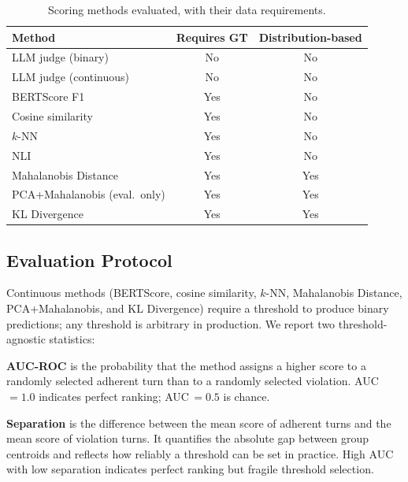 \documentclass[11pt,a4paper]{article}
\begin{document}
\begin{table}[h]
  \centering
  \caption{Scoring methods evaluated, with their data requirements.}
  \label{tab:methods}
  \begin{tabular}{lcc}
    \toprule
    \textbf{Method} & \textbf{Requires GT} & \textbf{Distribution-based} \\
    \midrule
    LLM judge (binary)         & No  & No  \\
    LLM judge (continuous)     & No  & No  \\
    BERTScore F1               & Yes & No  \\
    Cosine similarity          & Yes & No  \\
    $k$-NN                     & Yes & No  \\
    NLI                        & Yes & No  \\
    Mahalanobis Distance       & Yes & Yes \\
    PCA+Mahalanobis (eval.\ only) & Yes & Yes \\
    KL Divergence              & Yes & Yes \\
    \bottomrule
  \end{tabular}
\end{table}

\subsection{Evaluation Protocol}

Continuous methods (BERTScore, cosine similarity, $k$-NN, Mahalanobis Distance,
PCA+Mahalanobis, and KL Divergence) require a threshold to produce binary
predictions; any threshold is arbitrary in production. We report two
threshold-agnostic statistics:

\textbf{AUC-ROC} \citep{hanley1982auc} is the probability that the method
assigns a higher score to a randomly selected adherent turn than to a
randomly selected violation.
AUC\,$= 1.0$ indicates perfect ranking; AUC\,$= 0.5$ is chance.

\textbf{Separation} is the difference between the mean score of adherent turns
and the mean score of violation turns. It quantifies the absolute gap between
group centroids and reflects how reliably a threshold can be set in practice.
High AUC with low separation indicates perfect ranking but fragile threshold
selection.
\end{document}
